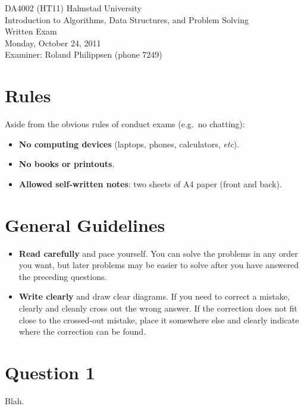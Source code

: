 \documentclass[a4paper]{article}
\begin{document}
\pagestyle{empty}
\thispagestyle{empty}



\noindent
\begin{minipage}{\columnwidth}
  \centering
  \Large
  DA4002 (HT11) Halmstad University\\
  Introduction to Algorithms, Data Structures, and Problem Solving\\[3\baselineskip]
  \Huge
  Written Exam\\
  \Large
  Monday, October 24, 2011\\[2\baselineskip]
  Examiner: Roland Philippsen (phone 7249)
\end{minipage}

\vfill



\section*{Rules}

Aside from the obvious rules of conduct exams (e.g.\ no chatting):

\begin{itemize}
\item
  \textbf{No computing devices} (laptops, phones, calculators, \emph{etc}).
\item
  \textbf{No books or printouts}.
\item
  \textbf{Allowed self-written notes}: two sheets of A4 paper (front and back).
\end{itemize}



\section*{General Guidelines}

\begin{itemize}
\item
  \textbf{Read carefully} and pace yourself.
  You can solve the problems in any order you want, but later problems may be easier to solve after you have answered the preceding questions.
\item
  \textbf{Write clearly} and draw clear diagrams.
  If you need to correct a mistake, clearly and cleanly cross out the wrong answer.
  If the correction does not fit close to the crossed-out mistake, place it somewhere else and clearly indicate where the correction can be found.
\end{itemize}



\pagebreak
\pagestyle{plain}
\thispagestyle{plain}
\setcounter{page}{1}



\section*{Question 1}

Blah.
\end{document}
